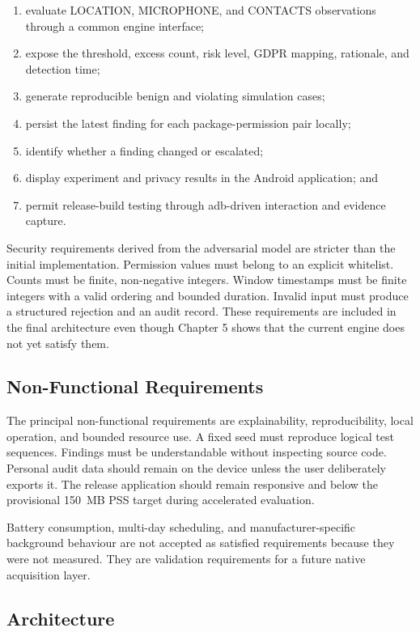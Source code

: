 \begin{enumerate}
    \item evaluate LOCATION, MICROPHONE, and CONTACTS observations through a common engine interface;
    \item expose the threshold, excess count, risk level, GDPR mapping, rationale, and detection time;
    \item generate reproducible benign and violating simulation cases;
    \item persist the latest finding for each package-permission pair locally;
    \item identify whether a finding changed or escalated;
    \item display experiment and privacy results in the Android application; and
    \item permit release-build testing through adb-driven interaction and evidence capture.
\end{enumerate}

Security requirements derived from the adversarial model are stricter than the initial implementation. Permission values must belong to an explicit whitelist. Counts must be finite, non-negative integers. Window timestamps must be finite integers with a valid ordering and bounded duration. Invalid input must produce a structured rejection and an audit record. These requirements are included in the final architecture even though Chapter 5 shows that the current engine does not yet satisfy them.

\subsection{Non-Functional Requirements}

The principal non-functional requirements are explainability, reproducibility, local operation, and bounded resource use. A fixed seed must reproduce logical test sequences. Findings must be understandable without inspecting source code. Personal audit data should remain on the device unless the user deliberately exports it. The release application should remain responsive and below the provisional 150~MB PSS target during accelerated evaluation.

Battery consumption, multi-day scheduling, and manufacturer-specific background behaviour are not accepted as satisfied requirements because they were not measured. They are validation requirements for a future native acquisition layer.

\subsection{Architecture}

